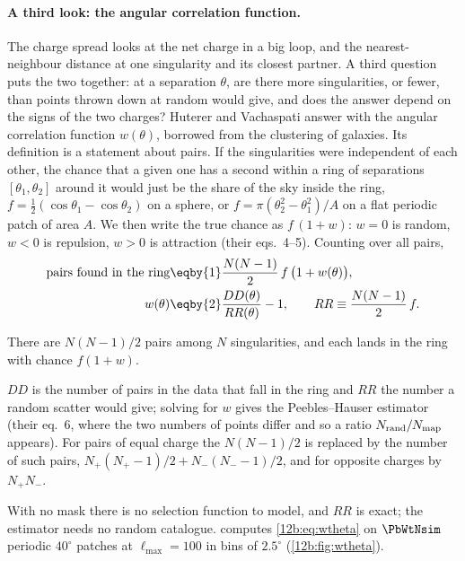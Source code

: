 \paragraph{A third look: the angular correlation function.} The charge spread looks at the net charge in a big loop, and
the nearest-neighbour distance at one singularity and its closest partner. A third question puts the two together:
at a separation $\theta$, are there more singularities, or fewer, than points thrown down at random would give, and
does the answer depend on the signs of the two charges? Huterer and Vachaspati answer with the angular correlation
function $w(\theta)$, borrowed from the clustering of galaxies. Its definition is a statement about pairs. If the
singularities were independent of each other, the chance that a given one has a second within a ring of
separations $[\theta_1,\theta_2]$ around it would just be the share of the sky inside the ring,
$f=\tfrac12(\cos\theta_1-\cos\theta_2)$ on a sphere, or $f=\pi(\theta_2^2-\theta_1^2)/A$ on a flat periodic patch of area
$A$. We then write the true chance as $f\,(1+w)$: $w=0$ is random, $w<0$ is repulsion, $w>0$ is attraction (their
eqs.~4--5). Counting over all pairs,
\begin{align}
  \text{pairs found in the ring}
  &\eqby{1}\frac{N(N-1)}{2}\,f\,\big(1+w(\theta)\big),\nonumber\\
  w(\theta)
  &\eqby{2}\frac{DD(\theta)}{RR(\theta)}-1 ,\qquad RR\equiv\frac{N(N-1)}{2}\,f .
  \label{12b:eq:wtheta}
\end{align}
\begin{explain}
  \item There are $N(N-1)/2$ pairs among $N$ singularities, and each lands in the ring with chance $f(1+w)$.
  \item $DD$ is the number of pairs in the data that fall in the ring and $RR$ the number a random scatter would
        give; solving for $w$ gives the Peebles--Hauser estimator \cite{HutererVachaspati2005} (their eq.~6, where the
        two numbers of points differ and so a ratio $N_{\rm rand}/N_{\rm map}$ appears). For pairs of equal charge the
        $N(N-1)/2$ is replaced by the number of such pairs, $N_+(N_+-1)/2+N_-(N_--1)/2$, and for opposite charges by
        $N_+N_-$.
\end{explain}
With no mask there is no selection function to model, and $RR$ is exact; the estimator needs no random catalogue.
 computes \eqref{12b:eq:wtheta} on $\PbWtNsim$ periodic $40^\circ$ patches at
$\ell_{\max}=100$ in bins of $2.5^\circ$ (\cref{12b:fig:wtheta}).

